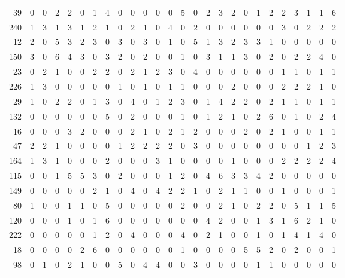 \begin{longtable}{@{\extracolsep{\fill}}rccccccccccccccccccccccccc@{}}
39 & 0 & 0 & 2 & 2 & 0 & 1 & 4 & 0 & 0 & 0 & 0 & 0 & 5 & 0 & 2 & 3 & 2 & 0 & 1 & 2 & 2 & 3 & 1 & 1 & 6 \\
240 & 1 & 3 & 1 & 3 & 1 & 2 & 1 & 0 & 2 & 1 & 0 & 4 & 0 & 2 & 0 & 0 & 0 & 0 & 0 & 0 & 3 & 0 & 2 & 2 & 2 \\
12 & 2 & 0 & 5 & 3 & 2 & 3 & 0 & 3 & 0 & 3 & 0 & 1 & 0 & 5 & 1 & 3 & 2 & 3 & 3 & 1 & 0 & 0 & 0 & 0 & 0 \\
150 & 3 & 0 & 6 & 4 & 3 & 0 & 3 & 2 & 0 & 2 & 0 & 0 & 1 & 0 & 3 & 1 & 1 & 3 & 0 & 2 & 0 & 2 & 2 & 4 & 0 \\
23 & 0 & 2 & 1 & 0 & 0 & 2 & 2 & 0 & 2 & 1 & 2 & 3 & 0 & 4 & 0 & 0 & 0 & 0 & 0 & 0 & 1 & 1 & 0 & 1 & 1 \\
226 & 1 & 3 & 0 & 0 & 0 & 0 & 0 & 1 & 0 & 1 & 0 & 1 & 1 & 0 & 0 & 0 & 2 & 0 & 0 & 0 & 2 & 2 & 2 & 1 & 0 \\
29 & 1 & 0 & 2 & 2 & 0 & 1 & 3 & 0 & 4 & 0 & 1 & 2 & 3 & 0 & 1 & 4 & 2 & 2 & 0 & 2 & 1 & 1 & 0 & 1 & 1 \\
132 & 0 & 0 & 0 & 0 & 0 & 0 & 5 & 0 & 2 & 0 & 0 & 0 & 1 & 0 & 1 & 2 & 1 & 0 & 2 & 6 & 0 & 1 & 0 & 2 & 4 \\
16 & 0 & 0 & 0 & 3 & 2 & 0 & 0 & 0 & 2 & 1 & 0 & 2 & 1 & 2 & 0 & 0 & 0 & 2 & 0 & 2 & 1 & 0 & 0 & 1 & 1 \\
47 & 2 & 2 & 1 & 0 & 0 & 0 & 0 & 1 & 2 & 2 & 2 & 2 & 0 & 3 & 0 & 0 & 0 & 0 & 0 & 0 & 0 & 0 & 1 & 2 & 3 \\
164 & 1 & 3 & 1 & 0 & 0 & 0 & 2 & 0 & 0 & 0 & 3 & 1 & 0 & 0 & 0 & 0 & 1 & 0 & 0 & 0 & 2 & 2 & 2 & 2 & 4 \\
115 & 0 & 0 & 1 & 5 & 5 & 3 & 0 & 2 & 0 & 0 & 0 & 1 & 2 & 0 & 4 & 6 & 3 & 3 & 4 & 2 & 0 & 0 & 0 & 0 & 0 \\
149 & 0 & 0 & 0 & 0 & 0 & 2 & 1 & 0 & 4 & 0 & 4 & 2 & 2 & 1 & 0 & 2 & 1 & 1 & 0 & 0 & 1 & 0 & 0 & 0 & 1 \\
80 & 1 & 0 & 0 & 1 & 1 & 0 & 5 & 0 & 0 & 0 & 0 & 0 & 2 & 0 & 0 & 2 & 1 & 0 & 2 & 2 & 0 & 5 & 1 & 1 & 5 \\
120 & 0 & 0 & 0 & 1 & 0 & 1 & 6 & 0 & 0 & 0 & 0 & 0 & 0 & 0 & 4 & 2 & 0 & 0 & 1 & 3 & 1 & 6 & 2 & 1 & 0 \\
222 & 0 & 0 & 0 & 0 & 0 & 1 & 2 & 0 & 4 & 0 & 0 & 0 & 4 & 0 & 2 & 1 & 0 & 0 & 1 & 0 & 1 & 4 & 1 & 4 & 0 \\
18 & 0 & 0 & 0 & 0 & 2 & 6 & 0 & 0 & 0 & 0 & 0 & 0 & 1 & 0 & 0 & 0 & 0 & 5 & 5 & 2 & 0 & 2 & 0 & 0 & 1 \\
98 & 0 & 1 & 0 & 2 & 1 & 0 & 0 & 5 & 0 & 4 & 4 & 0 & 0 & 3 & 0 & 0 & 0 & 0 & 1 & 1 & 0 & 0 & 0 & 0 & 0 \\

\end{longtable}
